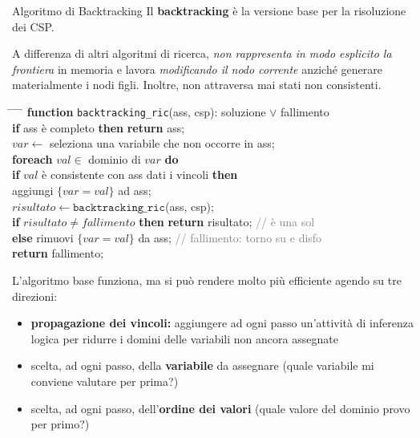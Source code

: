 \documentclass[a4paper,11pt]{report}
\begin{document}
\begin{gframe}{Algoritmo di Backtracking}{}
    Il \textbf{backtracking} è la versione base per la risoluzione dei CSP.

    A differenza di altri algoritmi di ricerca, \textit{non rappresenta in modo esplicito la frontiera} in memoria e lavora \textit{modificando il nodo corrente} anziché generare materialmente i nodi figli. Inoltre, non attraversa mai stati non consistenti.

\begin{tcolorbox}[colback=gray!10, colframe=gray!10, arc=4pt, boxrule=0pt, left=5pt, right=5pt, top=5pt, bottom=5pt]
    \begin{tabbing}
        \hspace{0.5cm} \= \hspace{0.5cm} \= \hspace{0.5cm} \= \hspace{0.5cm} \= \kill
        \textbf{function} \texttt{backtracking\_ric}(ass, csp): soluzione $\lor$ fallimento \\
        \> \textbf{if} ass è completo \textbf{then} \textbf{return} ass; \\[0.2cm]
        \> $var \leftarrow$ seleziona una variabile che non occorre in ass; \\
        \> \textbf{foreach} $val \in$ dominio di $var$ \textbf{do} \\
        \> \> \textbf{if} $val$ è consistente con ass dati i vincoli \textbf{then} \\
        \> \> \> aggiungi $\{var = val\}$ ad ass; \\
        \> \> \> $risultato \leftarrow \texttt{backtracking\_ric}$(ass, csp); \\[0.1cm]
        \> \> \> \textbf{if} $risultato \neq fallimento$ \textbf{then} \textbf{return} risultato; \textcolor{gray}{// è una sol} \\
        \> \> \> \textbf{else} rimuovi $\{var = val\}$ da ass; \textcolor{gray}{// fallimento: torno su e disfo} \\[0.2cm]
        \> \textbf{return} fallimento;
    \end{tabbing}
\end{tcolorbox}
\end{gframe}

L'algoritmo base funziona, ma si può rendere molto più efficiente agendo su tre direzioni:
\begin{itemize}
    \item \textbf{propagazione dei vincoli:} aggiungere ad ogni passo un'attività di inferenza logica per ridurre i domini delle variabili non ancora assegnate
    \item scelta, ad ogni passo, della \textbf{variabile} da assegnare (quale variabile mi conviene valutare per prima?)
    \item scelta, ad ogni passo, dell'\textbf{ordine dei valori} (quale valore del dominio provo per primo?)
\end{itemize}
\end{document}
